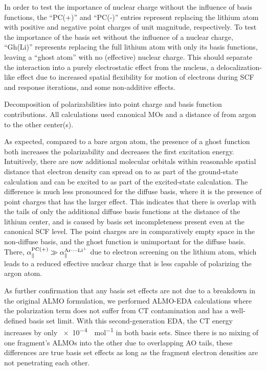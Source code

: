 \documentclass[%
  class = book,%
  crop = false,%
  float = true,%
  multi = true,%
  preview = false,%
]{standalone}
\let\cite\autocite
\newcommand{\arlidimer}{\ce{Ar\bond{....}Li+}}
\begin{document}
In order to test the importance of nuclear charge without the influence of basis functions, the ``PC(+)'' and ``PC(-)'' entries represent replacing the lithium atom with positive and negative point charges of unit magnitude, respectively. To test the importance of the basis set without the influence of a nuclear charge, ``Gh(Li)'' represents replacing the full lithium atom with only its basis functions, leaving a ``ghost atom'' with no (effective) nuclear charge. This should separate the \arlidimer{} interaction into a purely electrostatic effect from the nucleus, a delocalization-like effect due to increased spatial flexibility for motion of electrons during SCF and response iterations, and some non-additive effects.

\begin{table}
  \centering
  \caption[Point charge and basis function contributions to argon\textemdash{}lithium cation dimer polarizabilities]{Decomposition of polarizabilities into point charge and basis function contributions. All calculations used canonical MOs and a distance of \geomdeftsvpd{} from argon to the other center(s).}
  \label{tab:basis-set-dependence}
  \IfStandalone{}{}
\end{table}

As expected, compared to a bare argon atom, the presence of a ghost function both increases the polarizability and decreases the first excitation energy. Intuitively, there are now additional molecular orbitals within reasonable spatial distance that electron density can spread on to as part of the ground-state calculation and can be excited to as part of the excited-state calculation. The difference is much less pronounced for the diffuse basis, where it is the presence of point charges that has the larger effect. This indicates that there is overlap with the tails of only the additional diffuse basis functions at the distance of the lithium center, and is caused by basis set incompleteness present even at the canonical SCF level. The point charges are in comparatively empty space in the non-diffuse basis, and the ghost function is unimportant for the diffuse basis. There, \(\alpha_{\parallel}^{\text{PC(+)}} \gg \alpha_{\parallel}^{\arlidimer{}}\) due to electron screening on the lithium atom, which leads to a reduced effective nuclear charge that is less capable of polarizing the argon atom.

As further confirmation that any basis set effects are not due to a breakdown in the original ALMO formulation, we performed ALMO-EDA calculations where the polarization term does not suffer from CT contamination and has a well-defined basis set limit\cite{doi:10.1063/1.4930534}. With this second-generation EDA, the CT energy increases by only \SI{e-4}{\kcal\per\mol} in both basis sets. Since there is no mixing of one fragment's ALMOs into the other due to overlapping AO tails, these differences are true basis set effects as long as the fragment electron densities are not penetrating each other.
\end{document}

